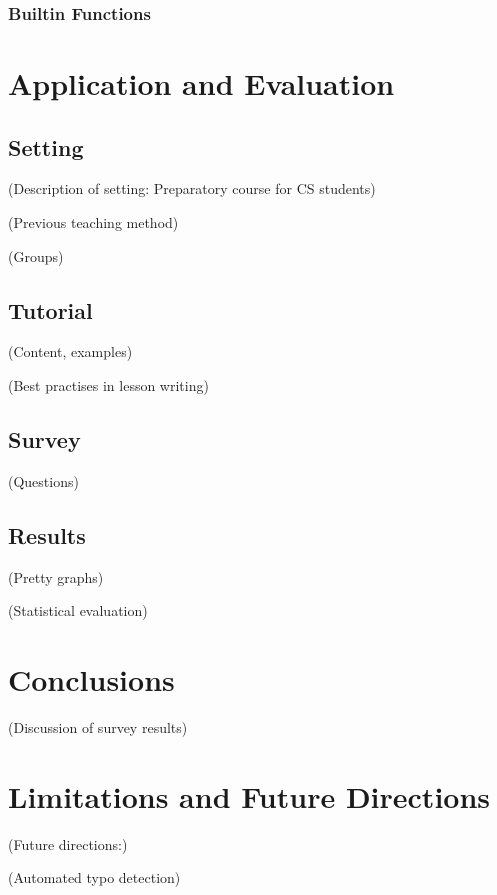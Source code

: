 \documentclass[twoside]{scrreprt}
\begin{document}
\subsection{Builtin Functions}

\chapter{Application and Evaluation}

\section{Setting}

        (Description of setting: Preparatory course for CS students)

        (Previous teaching method)

        (Groups)

\section{Tutorial}

        (Content, examples)

        (Best practises in lesson writing)

\section{Survey}

        (Questions)

\section{Results}

    (Pretty graphs)

    (Statistical evaluation)

\chapter{Conclusions}

(Discussion of survey results)

\chapter{Limitations and Future Directions}

(Future directions:)

    (Automated typo detection)
\end{document}

